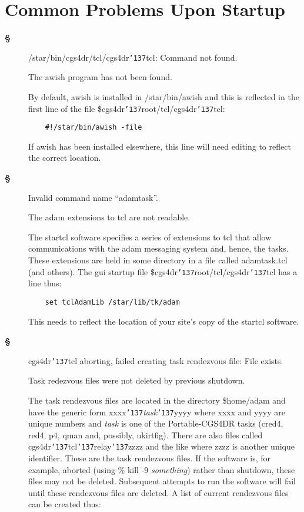 \documentclass[a4paper]{book}
\renewcommand{\_}{{\tt\char'137}}
\begin{document}
\section{Common Problems Upon Startup}
\begin{description}
\item[{\bf \S}] {\sf /star/bin/cgs4dr/tcl/cgs4dr\_tcl: Command not found.} 

  The awish program has not been found.

  By default, awish is installed in /star/bin/awish and this is reflected
  in the first line of the file {\sc \$cgs4dr\_root}/tcl/cgs4dr\_tcl:
  \begin{verbatim}
    #!/star/bin/awish -file
  \end{verbatim}
  If awish has been installed elsewhere, this line will need editing to reflect 
  the correct location.

\item[{\bf \S}] {\sf Invalid command name ``adamtask''.}

  The {\sc adam} extensions to tcl are not readable. 

  The {\sc startcl} software specifies a series of extensions to tcl that allow
  communications with the {\sc adam} messaging system and, hence, the tasks. These
  extensions are held in some directory in a file called adamtask.tcl (and others).
  The {\sc gui} startup file {\sc \$cgs4dr\_root}/tcl/cgs4dr\_tcl has a line thus:
  \begin{verbatim}
    set tclAdamLib /star/lib/tk/adam
  \end{verbatim}
  This needs to reflect the location of your site's copy of the {\sc startcl} software.

\item[{\bf \S}] {\sf cgs4dr\_tcl aborting, failed creating task rendezvous file: File exists.}

  Task redezvous files were not deleted by previous shutdown.

  The task rendezvous files are located in the directory {\sc \$home}/adam and have the generic form 
  {\sf xxxx}\_{\em task}\_{\sf yyyy} where {\sf xxxx} and {\sf yyyy} are unique numbers
  and {\em task} is one of the Portable-CGS4DR tasks (cred4, red4, p4, qman and, possibly, ukirtfig).
  There are also files called cgs4dr\_tcl\_relay\_{\sf zzzz} and the like where {\sf zzzz}
  is another unique identifier. These are the task rendezvous files. If the software is, 
  for example, aborted (using \% kill -9 {\em something}) rather than shutdown, these files may not be deleted.
  Subsequent attempts to run the software will fail until these rendezvous files are
  deleted. A list of current rendezvous files can be created thus:


\end{description}
\end{document}

